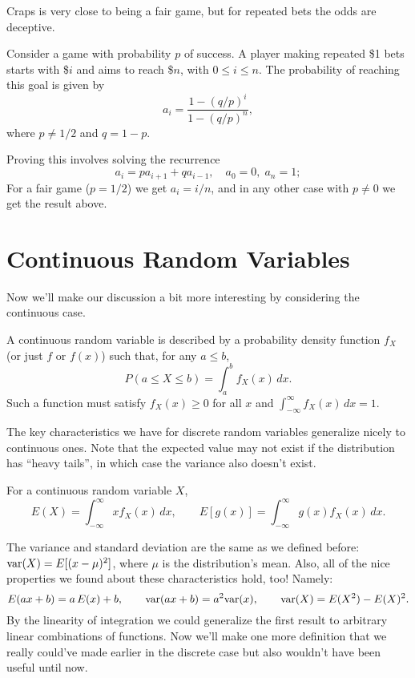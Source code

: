 \documentclass[../m157main.tex]{subfiles}
\begin{document}
Craps is very close to being a fair game, but for repeated bets the odds are deceptive.

\begin{theorem} %
    Consider a game with probability $p$ of success.
    A player making repeated \$1 bets starts with \$$i$ and aims to reach \$$n$, with $0 \leq i \leq n$.
    The probability of reaching this goal is given by
    \[ a_i = \frac{1 - (q / p)^{i}}{1 - (q / p)^{n}}, \]
    where $p \neq 1 / 2$ and $q = 1 - p$.
\end{theorem}

Proving this involves solving the recurrence
\[ a_i = p a_{i+1} + q a_{i-1}, \quad a_0 = 0, \; a_n = 1; \]
For a fair game ($p = 1 / 2$) we get $a_i = i / n$, and in any other case with $p \neq 0$ we get the result above.

\section{Continuous Random Variables}
Now we'll make our discussion a bit more interesting by considering the continuous case.

\begin{definition}
    A continuous random variable is described by a probability density function $f_X$ (or just $f$ or $f(x)$) such that, for any $a \leq b$,
    \[ P(a \leq X \leq b) = \int_{a}^{b} f_X(x) \,dx. \]
    Such a function must satisfy $f_X(x) \geq 0$ for all $x$ and $\int_{-\infty}^{\infty} f_X(x) \,dx = 1$.
\end{definition}

The key characteristics we have for discrete random variables generalize nicely to continuous ones.
Note that the expected value may not exist if the distribution has ``heavy tails'', in which case the variance also doesn't exist.

\begin{definition}
    For a continuous random variable $X$,
    \[ E(X) = \int_{-\infty}^{\infty} x f_X(x) \,dx, \qquad E[g(x)] = \int_{-\infty}^{\infty} g(x) f_X(x) \,dx. \]
\end{definition}

The variance and standard deviation are the same as we defined before: $\textrm{var}(X) = E[(x-\mu)^2]$, where $\mu$ is the distribution's mean.
Also, all of the nice properties we found about these characteristics hold, too!
Namely:
\[ E(ax + b) = a \,E(x) + b, \qquad \textrm{var}(ax + b) = a^2 \textrm{var}(x), \qquad \textrm{var}(X) = E(X^2) - E(X)^2. \]
By the linearity of integration we could generalize the first result to arbitrary linear combinations of functions.
Now we'll make one more definition that we really could've made earlier in the discrete case but also wouldn't have been useful until now.
\end{document}
